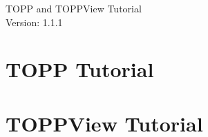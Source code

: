 \documentclass[a4paper]{article}
\begin{document}
\begin{titlepage}
\vspace*{7cm}
\begin{center}
{\Large TOPP and TOPPView Tutorial\\[1ex]\large Version: 1.1.1 }\\
\end{center}
\end{titlepage}


\setcounter{tocdepth}{2}
\tableofcontents
\pagebreak

\section{TOPP Tutorial}
	
	
	\pagebreak

	
	\pagebreak
	
	\pagebreak
	
	\pagebreak
	
	\pagebreak
	
	\pagebreak
	
	\pagebreak

\section{TOPPView Tutorial}
	
	
	\pagebreak
	
	\pagebreak
	
	\pagebreak
	
\end{document}
